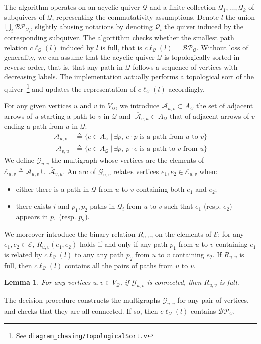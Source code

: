 \documentclass[10pt,a4paper]{article}
\newtheorem{lemma}[theorem]{Lemma}
\renewcommand{\~}{\widetilde}
\newcommand{\G}{\mathcal G}
\newcommand{\A}{\mathcal A}
\newcommand{\Q}{\mathcal Q}
\newcommand{\BP}{\mathcal{BP}}
\newcommand{\E}{\mathcal E}
\newcommand{\cl}{c\ell} %
\newcommand{\concat}{\!\cdot\!} %
\newcommand{\arcsfrom}[1]{\A_{#1}} %
\newcommand{\arcsto}[1]{\;\overline{\!\!\A}_{#1}} %
\begin{document}
The algorithm operates on an acyclic quiver $\Q$ and a finite collection $\Q_1, \dots, \Q_k$ of subquivers of $\Q$, representing the commutativity assumptions. Denote $l$ the union $\bigcup_{i}\BP_{\Q_i}$, slightly abusing notations by denoting $\Q_i$ the quiver induced by the corresponding subquiver. The algortithm checks whether the smallest path relation $\cl_\Q(l)$ induced by $l$ is full, that is $\cl_\Q(l) = \BP_\Q$. Without loss of generality, we can assume that the acyclic quiver $\Q$ is topologically sorted in reverse order, that is, that any path in $\Q$ follows a sequence of vertices with decreasing labels. The implementation actually performs a topological sort of the quiver~\footnote{See \texttt{diagram\_chasing/TopologicalSort.v}} and updates the representation of $\cl_\Q(l)$ accordingly.

For any given vertices $u$ and $v$ in $V_\Q$, we introduce $\arcsfrom{u,v} \subset A_\Q$ the set of adjacent arrows of $u$ starting a path to $v$ in $\Q$ and $\arcsto{v,u} \subset A_\Q$ that of adjacent arrows of $v$ ending a path from $u$ in $\Q$:
\begin{align*}
\arcsfrom{u,v} & \triangleq \{ e \in A_\Q\ |\ \exists p,\ e\concat p \textrm{ is a path from } u \textrm{ to } v \} \\
\arcsto{v,u} & \triangleq \{ e \in A_\Q\ |\ \exists p,\ p\concat e \textrm{ is a path to } v \textrm{ from } u \}
\end{align*}
We define $\G_{u,v}$ the multigraph whose vertices are the elements of $\E_{u,v} \triangleq \arcsfrom{u,v} \cup \arcsto{v,u}$. An arc of $\G_{u,v}$ relates vertices $e_1, e_2 \in \E_{u,v}$ when:
\begin{itemize}
  \item either there is a path in $\Q$ from $u$ to $v$ containing both $e_1$ and $e_2$;
  \item there exists $i$ and $p_1, p_2$ paths in $\Q_i$ from $u$ to $v$ such that $e_1$ (resp. $e_2$) appears in $p_1$ (resp. $p_2$).
\end{itemize}
We moreover introduce the binary relation $R_{u,v}$, on the elements of $\E$: for any $e_1, e_2 \in \E$, $R_{u,v}(e_1, e_2)$ holds if and only if any path $p_1$ from $u$ to $v$ containing $e_1$ is related by $\cl_\Q(l)$ to any  any path $p_2$ from $u$ to $v$ containing $e_2$. If $R_{u,v}$ is full, then $\cl_\Q(l)$ contains all the pairs of paths from $u$ to $v$.
\begin{lemma}\label{lem:commerge}
  For any vertices $u,v \in V_\Q$, if\/ $\G_{u,v}$ is connected, then $R_{u,v}$ is full.
\end{lemma}
The decision procedure constructs the multigraphs $\G_{u,v}$ for any pair of vertices, and checks that they are all connected. If so, then $\cl_\Q(l)$ contains $\BP_\Q$.
\end{document}
